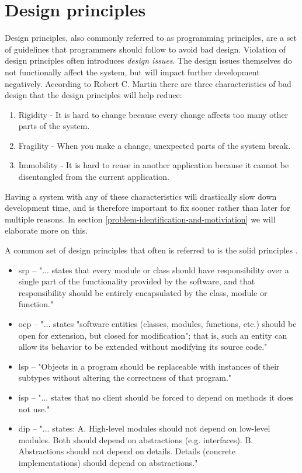 \documentclass[pdftex,10pt,b5paper,twoside]{report}
\begin{document}
\section{Design principles}
\label{design-principles}
Design principles, also commonly referred to as programming principles, are a set of guidelines that programmers should follow to avoid bad design. Violation of design principles often introduces \textit{design issues}. The design issues themselves do not functionally affect the system, but will impact further development negatively. According to Robert C. Martin \cite{robertcmartinprinciples} there are three characteristics of bad design that the design principles will help reduce:

\begin{enumerate}
	\item Rigidity - It is hard to change because every change affects too many other parts of the system.
	\item Fragility - When you make a change, unexpected parts of the system break.
	\item Immobility - It is hard to reuse in another application because it cannot be disentangled from the current application.
\end{enumerate}

Having a system with any of these characteristics will drastically slow down development time, and is therefore important to fix sooner rather than later for multiple reasons. In section \ref{problem-identification-and-motiviation} we will elaborate more on this.

A common set of design principles that often is referred to is the \gls{solid} principles \cite{solid}.

\begin{itemize}
    \item \gls{srp} -- "... states that every module or class should have responsibility over a single part of the functionality provided by the software, and that responsibility should be entirely encapsulated by the class, module or function." \cite{srp}
    
    \item \gls{ocp} -- "... states "software entities (classes, modules, functions, etc.) should be open for extension, but closed for modification"; that is, such an entity can allow its behavior to be extended without modifying its source code." \cite{ocp}
    \item \gls{lsp} -- "Objects in a program should be replaceable with instances of their subtypes without altering the correctness of that program." \cite{lsp}
    \item \gls{isp} -- "... states that no client should be forced to depend on methods it does not use." \cite{isp}
    \item \gls{dip} --  "... states: \newline A. High-level modules should not depend on low-level modules. Both should depend on abstractions (e.g. interfaces). \newline
B. Abstractions should not depend on details. Details (concrete implementations) should depend on abstractions." \cite{dip}
\end{itemize}
    
\end{document}
